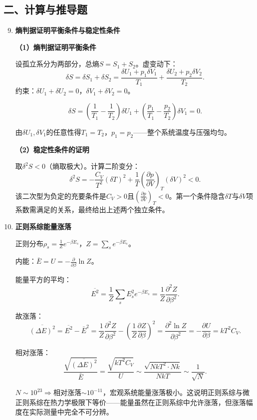 \documentclass[12pt,a4paper,fontset=mac]{ctexart}
\newcommand{\đ}{\mathrm{đ}}
\begin{document}
\newpage

\subsection*{二、计算与推导题}

\begin{enumerate}
\setcounter{enumi}{8}

\item \textbf{熵判据证明平衡条件与稳定性条件}

\textbf{（1）熵判据证明平衡条件}

设孤立系分为两部分，总熵$S=S_1+S_2$。虚变动下：
\[\delta S=\delta S_1+\delta S_2=\frac{\delta U_1+p_1\delta V_1}{T_1}+\frac{\delta U_2+p_2\delta V_2}{T_2}.\]
约束：$\delta U_1+\delta U_2=0$，$\delta V_1+\delta V_2=0$。

\[\delta S=\left(\frac{1}{T_1}-\frac{1}{T_2}\right)\delta U_1+\left(\frac{p_1}{T_1}-\frac{p_2}{T_2}\right)\delta V_1=0.\]

由$\delta U_1,\delta V_1$的任意性得$T_1=T_2$，$p_1=p_2$——整个系统温度与压强均匀。

\textbf{（2）稳定性条件的证明}

取$\delta^2S<0$（熵取极大）。计算二阶变分：
\[\delta^2S=-\frac{C_V}{T^2}(\delta T)^2+\frac{1}{T}\left(\frac{\partial p}{\partial V}\right)_T(\delta V)^2<0.\]
该二次型为负定的充要条件是$C_V>0$且$\left(\frac{\partial p}{\partial V}\right)_T<0$。第一个条件隐含$\delta T$与$\delta V$项系数需满足的关系，最终给出上述两个独立条件。

\item \textbf{正则系综能量涨落}

正则分布$\rho_s=\frac{1}{Z}e^{-\beta E_s}$，$Z=\sum_se^{-\beta E_s}$。

内能：$\bar{E}=U=-\frac{\partial}{\partial\beta}\ln Z$。

能量平方的平均：
\[\overline{E^2}=\frac{1}{Z}\sum_sE_s^2e^{-\beta E_s}=\frac{1}{Z}\frac{\partial^2Z}{\partial\beta^2}.\]

故涨落：
\[\overline{(\Delta E)^2}=\overline{E^2}-\bar{E}^2=\frac{1}{Z}\frac{\partial^2Z}{\partial\beta^2}-\left(\frac{1}{Z}\frac{\partial Z}{\partial\beta}\right)^2=\frac{\partial^2\ln Z}{\partial\beta^2}=-\frac{\partial U}{\partial\beta}=kT^2C_V.\]

相对涨落：
\[\frac{\sqrt{\overline{(\Delta E)^2}}}{\bar{E}}=\frac{\sqrt{kT^2C_V}}{U}\sim\frac{\sqrt{NkT^2\cdot Nk}}{NkT}\sim\frac{1}{\sqrt{N}}.\]

$N\sim10^{23}\Rightarrow$相对涨落$\sim10^{-11}$，宏观系统能量涨落极小。这说明正则系综与微正则系综在热力学极限下等价——能量虽然在正则系综中允许涨落，但涨落幅度在实际测量中完全不可分辨。


\end{enumerate}
\end{document}
